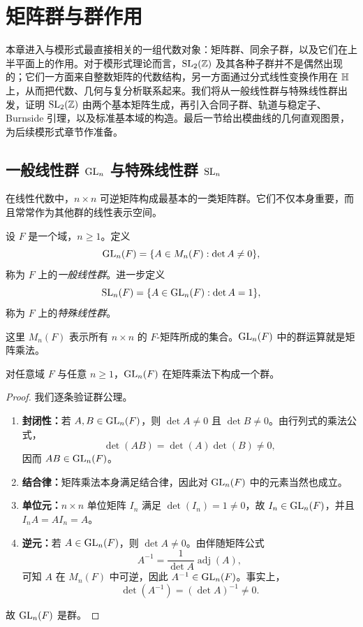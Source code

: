 \chapter{矩阵群与群作用}

本章进入与模形式最直接相关的一组代数对象：矩阵群、同余子群，以及它们在上半平面上的作用。对于模形式理论而言，$\mathrm{SL}_2(\mathbb{Z})$ 及其各种子群并不是偶然出现的；它们一方面来自整数矩阵的代数结构，另一方面通过分式线性变换作用在 $\mathbb{H}$ 上，从而把代数、几何与复分析联系起来。我们将从一般线性群与特殊线性群出发，证明 $\mathrm{SL}_2(\mathbb{Z})$ 由两个基本矩阵生成，再引入合同子群、轨道与稳定子、Burnside 引理，以及标准基本域的构造。最后一节给出模曲线的几何直观图景，为后续模形式章节作准备。

\section{一般线性群 $\mathrm{GL}_n$ 与特殊线性群 $\mathrm{SL}_n$}

在线性代数中，$n\times n$ 可逆矩阵构成最基本的一类矩阵群。它们不仅本身重要，而且常常作为其他群的线性表示空间。

\begin{definition}
设 $F$ 是一个域，$n\ge 1$。定义
\[
\mathrm{GL}_n(F)=\{A\in M_n(F):\det A\ne 0\},
\]
称为 $F$ 上的\emph{一般线性群}。进一步定义
\[
\mathrm{SL}_n(F)=\{A\in \mathrm{GL}_n(F):\det A=1\},
\]
称为 $F$ 上的\emph{特殊线性群}。
\end{definition}

这里 $M_n(F)$ 表示所有 $n\times n$ 的 $F$-矩阵所成的集合。$\mathrm{GL}_n(F)$ 中的群运算就是矩阵乘法。

\begin{proposition}
对任意域 $F$ 与任意 $n\ge 1$，$\mathrm{GL}_n(F)$ 在矩阵乘法下构成一个群。
\end{proposition}

\begin{proof}
我们逐条验证群公理。

\begin{enumerate}
  \item \textbf{封闭性：}若 $A,B\in \mathrm{GL}_n(F)$，则 $\det A\ne 0$ 且 $\det B\ne 0$。由行列式的乘法公式，
  \[
  \det(AB)=\det(A)\det(B)\ne 0,
  \]
  因而 $AB\in \mathrm{GL}_n(F)$。

  \item \textbf{结合律：}矩阵乘法本身满足结合律，因此对 $\mathrm{GL}_n(F)$ 中的元素当然也成立。

  \item \textbf{单位元：}$n\times n$ 单位矩阵 $I_n$ 满足 $\det(I_n)=1\ne 0$，故 $I_n\in \mathrm{GL}_n(F)$，并且 $I_nA=AI_n=A$。

  \item \textbf{逆元：}若 $A\in \mathrm{GL}_n(F)$，则 $\det A\ne 0$。由伴随矩阵公式
  \[
  A^{-1}=\frac{1}{\det A}\operatorname{adj}(A),
  \]
  可知 $A$ 在 $M_n(F)$ 中可逆，因此 $A^{-1}\in \mathrm{GL}_n(F)$。事实上，
  \[
  \det(A^{-1})=(\det A)^{-1}\ne 0.
  \]
\end{enumerate}
故 $\mathrm{GL}_n(F)$ 是群。
\end{proof}

